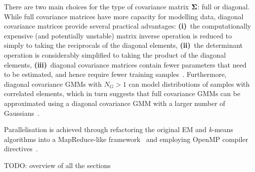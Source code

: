 There are two main choices for the type of covariance matrix ${\boldsymbol{\Sigma}}$: full or diagonal.
While full covariance matrices have more capacity for modelling data,
diagonal covariance matrices provide several practical advantages:
{\bf (i)}~the computationally expensive (and potentially unstable) matrix inverse operation is reduced to simply to taking the reciprocals of the diagonal elements,
{\bf (ii)}~the determinant operation is considerably simplified to taking the product of the diagonal elements,
{\bf (iii)}~diagonal covariance matrices contain fewer parameters that need to be estimated, and hence require fewer training samples~\cite{Duda01}.
Furthermore, diagonal covariance GMMs with $N_G > 1$ can model distributions of samples with correlated elements,
which in turn suggests that full covariance GMMs can be approximated using a diagonal covariance GMM with a larger number of Gaussians~\cite{Reynolds_2000}.


Parallelisation is achieved through refactoring the original EM and {\it k}-means algorithms
into a MapReduce-like framework~\cite{MapReduce_2004} and employing OpenMP compiler directives~\cite{OpenMP_2007}.

TODO: overview of all the sections

